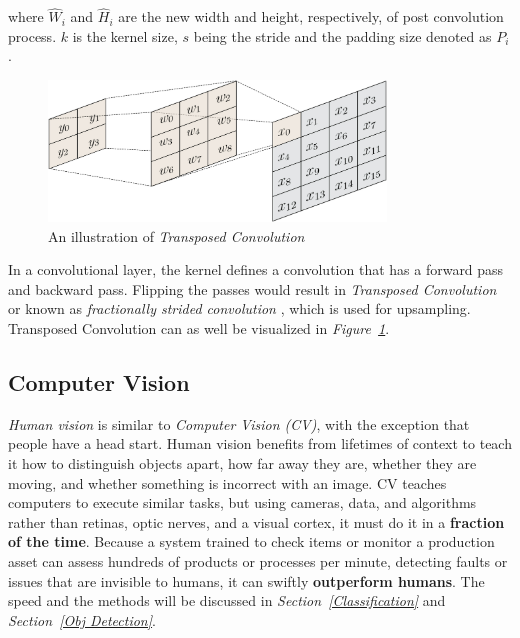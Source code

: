 \documentclass[12pt]{extarticle}
\begin{document}
	where $\hat{W}_i$ and $\hat{H}_i$ are the new width and height, respectively, of post convolution process. $k$ is the kernel size, $s$ being the stride and the padding size denoted as $P_i$. 
	
	\begin{figure}[h]
		\centering
		\includegraphics[width=0.8\textwidth]{pics/Figures/reverse_convolution.png}
		\caption{\small{An illustration of \emph{Transposed Convolution}}}
		\label{fig:T_Conv}
	\end{figure}
	
	In a convolutional layer, the kernel defines a convolution that has a forward pass and backward pass. Flipping the passes would result in \emph{Transposed Convolution} or known as \emph{fractionally strided convolution} \cite{stride}, which is used for upsampling. Transposed Convolution can as well be visualized in \emph{Figure~\ref{fig:T_Conv}}.
	\subsection{Computer Vision}\label{CV}
	\emph{Human vision} is similar to \emph{Computer Vision (CV)}, with the exception that people have a head start. Human vision benefits from lifetimes of context to teach it how to distinguish objects apart, how far away they are, whether they are moving, and whether something is incorrect with an image. CV teaches computers to execute similar tasks, but using cameras, data, and algorithms rather than retinas, optic nerves, and a visual cortex, it must do it in a \textbf{fraction of the time}. Because a system trained to check items or monitor a production asset can assess hundreds of products or processes per minute, detecting faults or issues that are invisible to humans, it can swiftly \textbf{outperform humans}. The speed and the methods will be discussed in \emph{Section~\ref{Classification}} and \emph{Section~\ref{Obj Detection}}.
\end{document}
